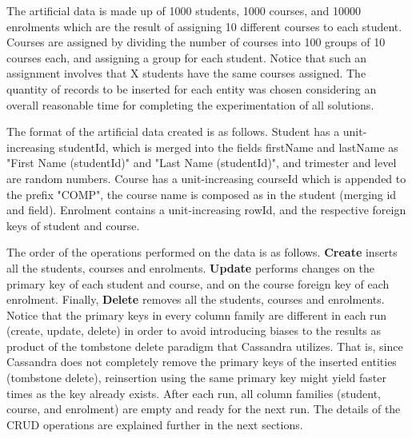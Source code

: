 The artificial data is made up of 1000 students, 1000 courses, and 10000
enrolments which are the result of assigning 10 different courses to each
student. Courses are assigned by dividing the number of courses
into 100 groups of 10 courses each, and assigning a group for each student.
Notice that such an assignment involves that X students have the same courses
assigned. The quantity of records to be inserted for each entity was chosen
considering an overall reasonable time for completing the experimentation of all
solutions.
		
The format of the artificial data created is as follows. Student has a
unit-increasing studentId, which is merged into the fields firstName and
lastName as "First Name (studentId)" and "Last Name (studentId)", and trimester
and level are random numbers. Course has a   unit-increasing courseId which is
appended to the prefix "COMP", the course name is composed as in the student
(merging id and field). Enrolment contains a unit-increasing rowId, and the
respective foreign keys of student and course.
		
The order of the operations performed on the data is as follows. \textbf{Create}
inserts all the students, courses and enrolments. \textbf{Update} performs
changes on the primary key of each student and course, and on the course foreign
key of each enrolment. Finally, \textbf{Delete} removes all the students,
courses and enrolments. Notice that the primary keys in every column family are
different in each run (create, update, delete) in order to avoid introducing
biases to the results as product of the tombstone delete paradigm that Cassandra
utilizes. That is, since Cassandra does not completely remove the primary keys
of the inserted entities (tombstone delete), reinsertion using the same primary
key might yield faster times as the key already exists. After each run, all
column families (student, course, and enrolment) are empty and ready for the
next run.  The details  of the \ac{CRUD} operations are explained further in the
next sections.
		
